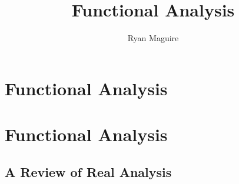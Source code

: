 \documentclass[crop=false,class=book,oneside]{standalone}
\begin{document}
    \ifx\ifmathcourses\undefined
        \title{Functional Analysis}
        \author{Ryan Maguire}
        \date{\vspace{-5ex}}
        \maketitle
        \tableofcontents
        \clearpage
        \chapter*{Functional Analysis}
        \vspace{10ex}
        \setcounter{chapter}{1}
    \else
        \chapter{Functional Analysis}
    \fi
    \section{A Review of Real Analysis}
\end{document}
